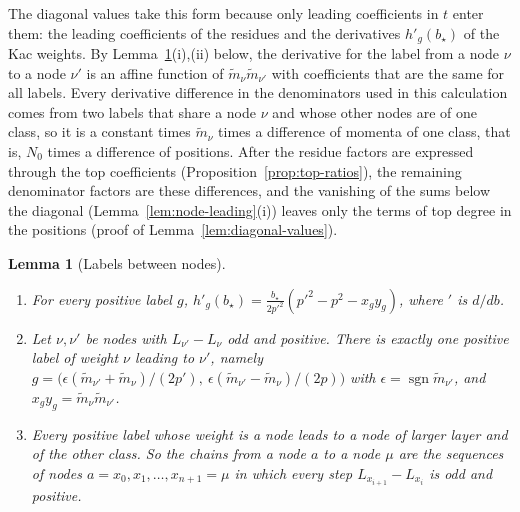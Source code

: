\documentclass[twoside,10pt]{article}
\numberwithin{equation}{section}
\theoremstyle{slbody}
\newtheorem{lemma}[theorem]{Lemma}
\theoremstyle{definition}
\theoremstyle{remark}
\begin{document}
The diagonal values take this form because only leading coefficients in $t$
enter them: the leading coefficients of the residues and the derivatives
$h'_g(b_\star)$ of the Kac weights.  By Lemma~\ref{lem:node-labels}(i),(ii)
below, the derivative for the label from a node $\nu$ to a node $\nu'$ is an
affine function of $\tilde m_\nu\tilde m_{\nu'}$ with coefficients that are
the same for all labels.  Every derivative difference in the denominators
used in this calculation comes from two labels that share a node $\nu$ and
whose other nodes are of one class, so it is a constant times $\tilde m_\nu$
times a difference of momenta of one class, that is, $N_0$ times a difference
of positions.  After the residue factors are expressed through the top
coefficients (Proposition~\ref{prop:top-ratios}), the remaining denominator
factors are these differences, and the vanishing of the sums below the
diagonal (Lemma~\ref{lem:node-leading}(i)) leaves only the terms of top
degree in the positions (proof of Lemma~\ref{lem:diagonal-values}).

\begin{lemma}[Labels between nodes]\label{lem:node-labels}
\begin{enumerate}
\item[(i)] For every positive label $g$,
$h'_g(b_\star)=\frac{b_\star}{2p'^2}(p'^2-p^2-x_gy_g)$, where $'$ is $d/db$.
\item[(ii)] Let $\nu,\nu'$ be nodes with $L_{\nu'}-L_\nu$ odd and
positive.  There is exactly one positive label of weight $\nu$ leading to
$\nu'$, namely
$g=\bigl(\epsilon(\tilde m_{\nu'}+\tilde m_\nu)/(2p'),\ \epsilon(\tilde m_{\nu'}-\tilde m_\nu)/(2p)\bigr)$
with $\epsilon=\operatorname{sgn}\tilde m_{\nu'}$, and $x_gy_g=\tilde m_\nu \tilde m_{\nu'}$.
\item[(iii)] Every positive label whose weight is a node leads to a node of
larger layer and of the other class.  So the chains from a node $a$ to a node
$\mu$ are the sequences of nodes $a=x_0,x_1,\dots,x_{n+1}=\mu$ in which every
step $L_{x_{i+1}}-L_{x_i}$ is odd and positive.
\end{enumerate}
\end{lemma}
\end{document}
